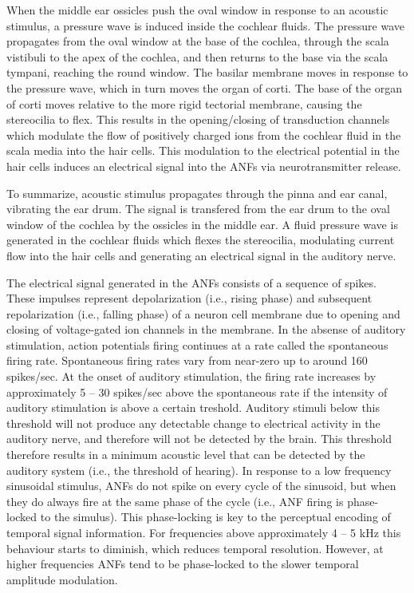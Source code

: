 When the middle ear ossicles push the oval window in response to an acoustic stimulus, a pressure wave is induced inside the cochlear fluids. The pressure wave propagates from the oval window at the base of the cochlea, through the scala vistibuli to the apex of the cochlea, and then returns to the base via the scala tympani, reaching the round window. The basilar membrane moves in response to the pressure wave, which in turn moves the organ of corti. The base of the organ of corti moves relative to the more rigid tectorial membrane, causing the stereocilia to flex. This results in the opening/closing of transduction channels which modulate the flow of positively charged ions from the cochlear fluid in the scala media into the hair cells. This modulation to the electrical potential in the hair cells induces an electrical signal into the ANFs via neurotransmitter release.

To summarize, acoustic stimulus propagates through the pinna and ear canal, vibrating the ear drum. The signal is transfered from the ear drum to the oval window of the cochlea by the ossicles in the middle ear. A fluid pressure wave is generated in the cochlear fluids which flexes the stereocilia, modulating current flow into the hair cells and generating an electrical signal in the auditory nerve. 

The electrical signal generated in the ANFs consists of a sequence of spikes. These impulses represent depolarization (i.e., rising phase) and subsequent repolarization (i.e., falling phase) of a neuron cell membrane due to opening and closing of voltage-gated ion channels in the membrane. In the absense of auditory stimulation, action potentials firing continues at a rate called the spontaneous firing rate. Spontaneous firing rates vary from near-zero up to around 160 spikes/sec. At the onset of auditory stimulation, the firing rate increases by approximately 5 -- 30 spikes/sec above the spontaneous rate if the intensity of auditory stimulation is above a certain treshold. Auditory stimuli below this threshold will not produce any detectable change to electrical activity in the auditory nerve, and therefore will not be detected by the brain. This threshold therefore results in a minimum acoustic level that can be detected by the auditory system (i.e., the threshold of hearing). In response to a low frequency sinusoidal stimulus, ANFs do not spike on every cycle of the sinusoid, but when they do always fire at the same phase of the cycle (i.e., ANF firing is phase-locked to the simulus). This phase-locking is key to the perceptual encoding of temporal signal information. For frequencies above approximately 4 -- 5 \unit{\kilo\hertz} this behaviour starts to diminish, which reduces temporal resolution. However, at higher frequencies ANFs tend to be phase-locked to the slower temporal amplitude modulation.

